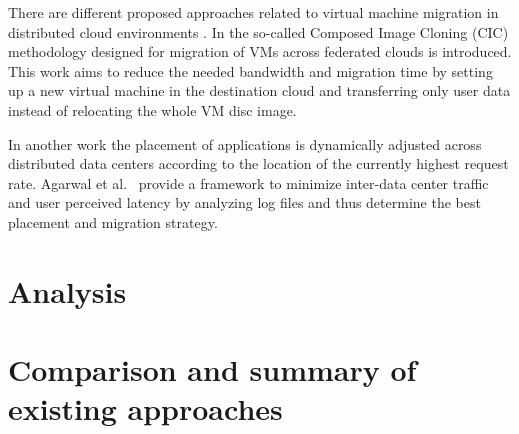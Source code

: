 There are different proposed approaches related to virtual machine migration in distributed cloud environments \cite{celesti2010improving, malet2010resource}. In \cite{celesti2010improving} the so-called Composed Image Cloning (CIC) methodology designed for migration of VMs across federated clouds is introduced. This work aims to reduce the needed bandwidth and migration time by setting up a new virtual machine in the destination cloud and transferring only user data instead of relocating the whole VM disc image. 

In another work \cite{malet2010resource} the placement of applications is dynamically adjusted across distributed data centers according to the location of the currently highest request rate. Agarwal et al.~\cite{agarwal2010volley} provide a framework to minimize inter-data center traffic and user perceived latency by analyzing log files and thus determine the best placement and migration strategy. 



\section{Analysis}


\section{Comparison and summary of existing approaches}

